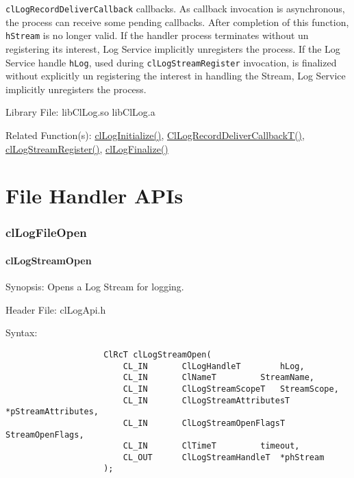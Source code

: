 \begin{flushleft}
\begin{Desc}
{\tt{clLogRecordDeliverCallback}} callbacks. As 
callback invocation is asynchronous, the process can receive some pending callbacks. After completion of this function, {\tt{hStream}} is no longer valid.
If the handler process terminates without un registering its interest, Log Service implicitly unregisters the process. If the Log Service handle 
{\tt{hLog}}, used during {\tt{clLogStreamRegister}} invocation, is finalized without explicitly un registering the interest in handling the Stream, 
Log Service implicitly unregisters the process.
\end{Desc}
\begin{Desc}
\item[Library File:] libClLog.so
\newline
libClLog.a
\end{Desc}
\begin{Desc}
\item[Related Function(s):]\hyperlink{pagelog101}{clLogInitialize()}, \hyperlink{pagelog113}{ClLogRecordDeliverCallbackT()},
\hyperlink{pagelog112}{clLogStreamRegister()}, \hyperlink{pagelog102}{clLogFinalize()}
\end{Desc}
\newpage


\section{File Handler APIs}
\subsubsection{clLogFileOpen}
\hypertarget{pagelog106}{}\paragraph{cl\-Log\-Stream\-Open}\label{pagelog106}
\begin{Desc}
\item[Synopsis:] Opens a Log Stream for logging.  \end{Desc}
\begin{Desc}
\item[Header File:] clLogApi.h \end{Desc}
\begin{Desc}
\item[Syntax:]
\footnotesize\begin{verbatim}        	
					ClRcT clLogStreamOpen(
						CL_IN		ClLogHandleT		hLog,
						CL_IN		ClNameT			StreamName,
						CL_IN 		ClLogStreamScopeT	StreamScope,
						CL_IN		ClLogStreamAttributesT	*pStreamAttributes,
						CL_IN		ClLogStreamOpenFlagsT	StreamOpenFlags,
						CL_IN		ClTimeT			timeout,
						CL_OUT		ClLogStreamHandleT	*phStream
					);
					

\end{verbatim}
\end{Desc}
\end{flushleft}
